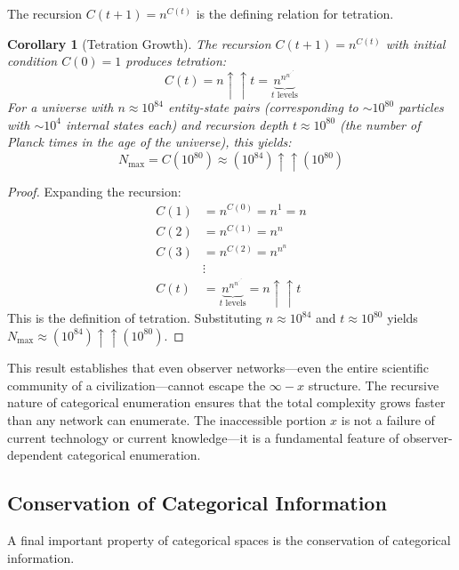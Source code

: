 \documentclass[12pt,a4paper]{article}
\newtheorem{corollary}[theorem]{Corollary}
\theoremstyle{definition}
\theoremstyle{remark}
\newcommand{\Nmax}{N_{\text{max}}}
\begin{document}
The recursion $C(t+1) = n^{C(t)}$ is the defining relation for tetration.

\begin{corollary}[Tetration Growth]
\label{cor:tetration}
The recursion $C(t+1) = n^{C(t)}$ with initial condition $C(0) = 1$ produces tetration:
\begin{equation}
C(t) = n \uparrow\uparrow t = \underbrace{n^{n^{n^{\cdot^{\cdot^{\cdot^{n}}}}}}}_{t \text{ levels}}
\end{equation}
For a universe with $n \approx 10^{84}$ entity-state pairs (corresponding to $\sim 10^{80}$ particles with $\sim 10^4$ internal states each) and recursion depth $t \approx 10^{80}$ (the number of Planck times in the age of the universe), this yields:
\begin{equation}
\Nmax = C(10^{80}) \approx (10^{84}) \uparrow\uparrow (10^{80})
\end{equation}
\end{corollary}

\begin{proof}
Expanding the recursion:
\begin{align}
C(1) &= n^{C(0)} = n^1 = n \\
C(2) &= n^{C(1)} = n^n \\
C(3) &= n^{C(2)} = n^{n^n} \\
&\vdots \\
C(t) &= \underbrace{n^{n^{n^{\cdot^{\cdot^{\cdot^{n}}}}}}}_{t \text{ levels}} = n \uparrow\uparrow t
\end{align}
This is the definition of tetration. Substituting $n \approx 10^{84}$ and $t \approx 10^{80}$ yields $\Nmax \approx (10^{84}) \uparrow\uparrow (10^{80})$.
\end{proof}

This result establishes that even observer networks—even the entire scientific community of a civilization—cannot escape the $\infty - x$ structure. The recursive nature of categorical enumeration ensures that the total complexity grows faster than any network can enumerate. The inaccessible portion $x$ is not a failure of current technology or current knowledge—it is a fundamental feature of observer-dependent categorical enumeration.

\subsection{Conservation of Categorical Information}

A final important property of categorical spaces is the conservation of categorical information.
\end{document}
